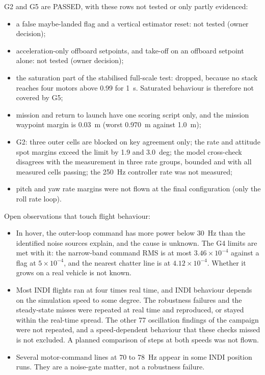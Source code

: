 G2 and G5 are PASSED, with these rows not tested or only partly evidenced:
\begin{itemize}
  \item a false maybe-landed flag and a vertical estimator reset: not tested (owner decision);
  \item acceleration-only offboard setpoints, and take-off on an offboard setpoint alone: not tested (owner decision);
  \item the saturation part of the stabilised full-scale test: dropped, because no stack reaches four motors above 0.99 for 1~s. Saturated behaviour is therefore not covered by G5;
  \item mission and return to launch have one scoring script only, and the mission waypoint margin is 0.03~m (worst 0.970~m against 1.0~m);
  \item G2: three outer cells are blocked on key agreement only; the rate and attitude spot margins exceed the limit by 1.9 and 3.0~deg; the model cross-check disagrees with the measurement in three rate groups, bounded and with all measured cells passing; the 250~Hz controller rate was not measured;
  \item pitch and yaw rate margins were not flown at the final configuration (only the roll rate loop).
\end{itemize}

Open observations that touch flight behaviour:
\begin{itemize}
  \item In hover, the outer-loop command has more power below 30~Hz than the identified noise sources explain, and the cause is unknown. The G4 limits are met with it: the narrow-band command RMS is at most $3.46\times 10^{-4}$ against a flag at $5\times 10^{-4}$, and the nearest chatter line is at $4.12\times 10^{-4}$. Whether it grows on a real vehicle is not known.
  \item Most INDI flights ran at four times real time, and INDI behaviour depends on the simulation speed to some degree. The robustness failures and the steady-state misses were repeated at real time and reproduced, or stayed within the real-time spread. The other 77 oscillation findings of the campaign were not repeated, and a speed-dependent behaviour that these checks missed is not excluded. A planned comparison of steps at both speeds was not flown.
  \item Several motor-command lines at 70 to 78~Hz appear in some INDI position runs. They are a noise-gate matter, not a robustness failure.
\end{itemize}

